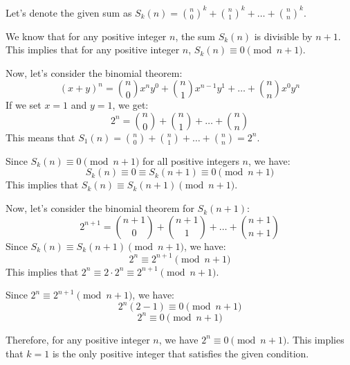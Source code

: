 Let's denote the given sum as \( S_k(n) = \binom{n}{0}^k + \binom{n}{1}^k + \dots + \binom{n}{n}^k \).

We know that for any positive integer \( n \), the sum \( S_k(n) \) is divisible by \( n+1 \). This implies that for any positive integer \( n \), \( S_k(n) \equiv 0 \pmod{n+1} \).

Now, let's consider the binomial theorem:
\[
(x+y)^n = \binom{n}{0}x^n y^0 + \binom{n}{1}x^{n-1}y^1 + \dots + \binom{n}{n}x^0 y^n
\]
If we set \( x = 1 \) and \( y = 1 \), we get:
\[
2^n = \binom{n}{0} + \binom{n}{1} + \dots + \binom{n}{n}
\]
This means that \( S_1(n) = \binom{n}{0} + \binom{n}{1} + \dots + \binom{n}{n} = 2^n \).

Since \( S_k(n) \equiv 0 \pmod{n+1} \) for all positive integers \( n \), we have:
\[
S_k(n) \equiv 0 \equiv S_k(n+1) \equiv 0 \pmod{n+1}
\]
This implies that \( S_k(n) \equiv S_k(n+1) \pmod{n+1} \).

Now, let's consider the binomial theorem for \( S_k(n+1) \):
\[
2^{n+1} = \binom{n+1}{0} + \binom{n+1}{1} + \dots + \binom{n+1}{n+1}
\]
Since \( S_k(n) \equiv S_k(n+1) \pmod{n+1} \), we have:
\[
2^n \equiv 2^{n+1} \pmod{n+1}
\]
This implies that \( 2^n \equiv 2 \cdot 2^n \equiv 2^{n+1} \pmod{n+1} \).

Since \( 2^n \equiv 2^{n+1} \pmod{n+1} \), we have:
\[
2^n(2-1) \equiv 0 \pmod{n+1}
\]
\[
2^n \equiv 0 \pmod{n+1}
\]

Therefore, for any positive integer \( n \), we have \( 2^n \equiv 0 \pmod{n+1} \). This implies that \( k = 1 \) is the only positive integer that satisfies the given condition.
